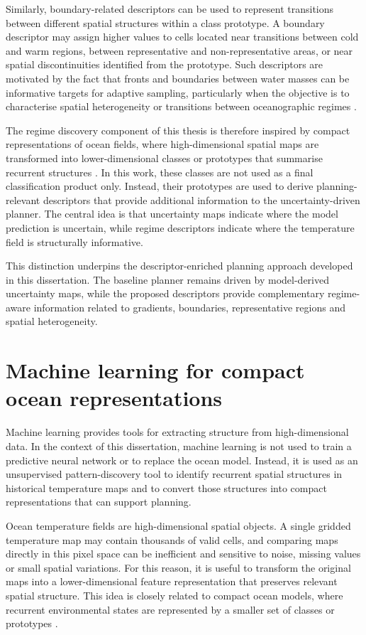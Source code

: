 Similarly, boundary-related descriptors can be used to represent transitions between different spatial structures within a class prototype. A boundary descriptor may assign higher values to cells located near transitions between cold and warm regions, between representative and non-representative areas, or near spatial discontinuities identified from the prototype. Such descriptors are motivated by the fact that fronts and boundaries between water masses can be informative targets for adaptive sampling, particularly when the objective is to characterise spatial heterogeneity or transitions between oceanographic regimes \cite{ge2023watermasses}.

The regime discovery component of this thesis is therefore inspired by compact representations of ocean fields, where high-dimensional spatial maps are transformed into lower-dimensional classes or prototypes that summarise recurrent structures \cite{fossum2020compact}. In this work, these classes are not used as a final classification product only. Instead, their prototypes are used to derive planning-relevant descriptors that provide additional information to the uncertainty-driven planner. The central idea is that uncertainty maps indicate where the model prediction is uncertain, while regime descriptors indicate where the temperature field is structurally informative.

This distinction underpins the descriptor-enriched planning approach developed in this dissertation. The baseline planner remains driven by model-derived uncertainty maps, while the proposed descriptors provide complementary regime-aware information related to gradients, boundaries, representative regions and spatial heterogeneity.

\section{Machine learning for compact ocean representations} \label{sec:ml_compact_representations}

Machine learning provides tools for extracting structure from high-dimensional data. In the context of this dissertation, machine learning is not used to train a predictive neural network or to replace the ocean model. Instead, it is used as an unsupervised pattern-discovery tool to identify recurrent spatial structures in historical temperature maps and to convert those structures into compact representations that can support planning.

Ocean temperature fields are high-dimensional spatial objects. A single gridded temperature map may contain thousands of valid cells, and comparing maps directly in this pixel space can be inefficient and sensitive to noise, missing values or small spatial variations. For this reason, it is useful to transform the original maps into a lower-dimensional feature representation that preserves relevant spatial structure. This idea is closely related to compact ocean models, where recurrent environmental states are represented by a smaller set of classes or prototypes \cite{fossum2020compact}.

